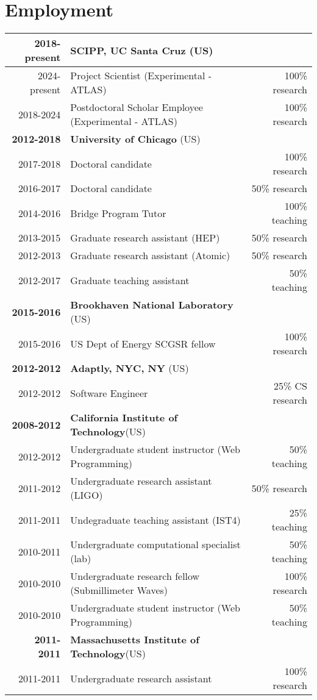 \vspace{-2.0em}\section{Employment}\vspace{-1em}
\begin{table*}[h!]
  \footnotesize
  \begin{tabular}{r|lr}
    \centering
    \normalsize\textbf{2018-present} & \textbf{SCIPP, UC Santa Cruz} (US) & \\
    \hline
    2024-present & Project Scientist (Experimental - ATLAS) & 100\% research \\
    2018-2024 & Postdoctoral Scholar Employee (Experimental - ATLAS) & 100\% research \\
    \hline\hline
    \normalsize\textbf{2012-2018} & \textbf{University of Chicago} (US) & \\
    \hline
    2017-2018 & Doctoral candidate & 100\% research \\
    2016-2017 & Doctoral candidate & 50\% research \\
    2014-2016 & Bridge Program Tutor & 100\% teaching \\
    2013-2015 & Graduate research assistant (HEP) & 50\% research \\
    2012-2013 & Graduate research assistant (Atomic) & 50\% research \\
    2012-2017 & Graduate teaching assistant & 50\% teaching \\
    \hline\hline
    \normalsize\textbf{2015-2016} & \textbf{Brookhaven National Laboratory} (US) & \\
    \hline
    2015-2016 & US Dept of Energy SCGSR fellow & 100\% research \\
    \hline\hline
    \normalsize\textbf{2012-2012} & \textbf{Adaptly, NYC, NY} (US) \\
    \hline
    2012-2012 & Software Engineer & 25\% CS research \\
    \hline\hline
    \normalsize\textbf{2008-2012} & \textbf{California Institute of Technology}(US) & \\
    \hline
    2012-2012 & Undergraduate student instructor (Web Programming) & 50\% teaching \\
    2011-2012 & Undergraduate research assistant (LIGO) & 50\% research \\
    2011-2011 & Undegraduate teaching assistant (IST4) & 25\% teaching \\
    2010-2011 & Undergraduate computational specialist (lab) & 50\% teaching \\
    2010-2010 & Undergraduate research fellow (Submillimeter Waves) & 100\% research \\
    2010-2010 & Undergraduate student instructor (Web Programming) & 50\% teaching \\
    \hline\hline
    \normalsize\textbf{~2011-2011} & \textbf{Massachusetts Institute of Technology}(US) & \\
    2011-2011 & Undergraduate research assistant & 100\% research \\
    \hline
  \end{tabular}
\end{table*}


